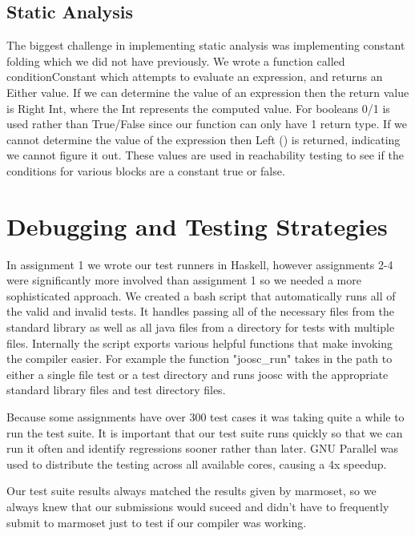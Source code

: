 \documentclass[12pt,letterpaper]{article}
\begin{document}
\subsection{Static Analysis}
The biggest challenge in implementing static analysis was implementing constant folding which we did not have previously.
We wrote a function called conditionConstant which attempts to evaluate an expression, and returns an Either value.
If we can determine the value of an expression then the return value is Right Int, where the Int represents the computed value.
For booleans 0/1 is used rather than True/False since our function can only have 1 return type.
If we cannot determine the value of the expression then Left () is returned, indicating we cannot figure it out.
These values are used in reachability testing to see if the conditions for various blocks are a constant true or false.

\section{Debugging and Testing Strategies}
In assignment 1 we wrote our test runners in Haskell, however assignments 2-4 were significantly more involved than assignment 1 so we needed a more sophisticated approach.
We created a bash script that automatically runs all of the valid and invalid tests.
It handles passing all of the necessary files from the standard library as well as all java files from a directory for tests with multiple files.
Internally the script exports various helpful functions that make invoking the compiler easier.
For example the function "joosc\_run" takes in the path to either a single file test or a test directory and runs joosc with the appropriate standard library files and test directory files.

Because some assignments have over 300 test cases it was taking quite a while to run the test suite.
It is important that our test suite runs quickly so that we can run it often and identify regressions sooner rather than later.
GNU Parallel was used to distribute the testing across all available cores, causing a 4x speedup.

Our test suite results always matched the results given by marmoset, so we always knew that our submissions would suceed and didn't have to frequently submit to marmoset just to test if our compiler was working.
\end{document}
